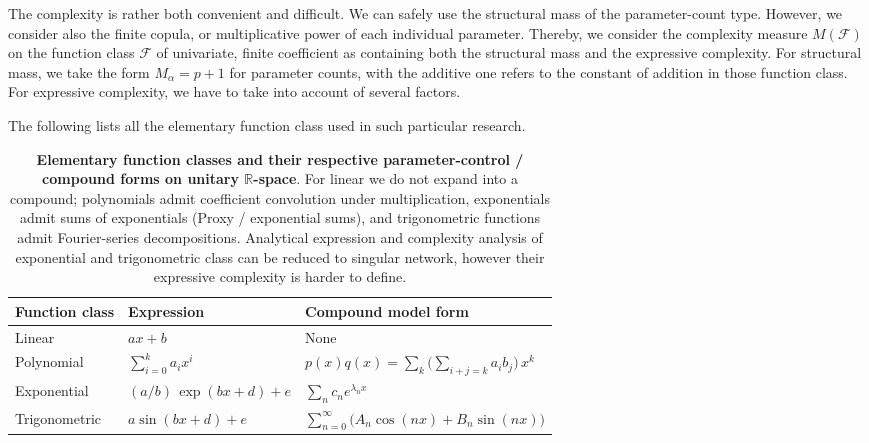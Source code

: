 \documentclass[twoside,10pt]{article}
\begin{document}
The complexity is rather both convenient and difficult. We can safely use the structural mass of the parameter-count type. However, we consider also the finite copula, or multiplicative power of each individual parameter. Thereby, we consider the complexity measure $M(\mathcal{F})$ on the function class $\mathcal{F}$ of univariate, finite coefficient as containing both the structural mass and the expressive complexity. For structural mass, we take the form $M_{\alpha}= p+1$ for parameter counts, with the additive one refers to the constant of addition in those function class. For expressive complexity, we have to take into account of several factors. 

The following lists all the elementary function class used in such particular research. 

\begin{table}[htb]
  \centering
  \begin{tabularx}{\textwidth}{L{2cm} L{3cm} Y}
    \toprule
    Function class & Expression & Compound model form\\
    \midrule
    Linear & \(a x + b\) & None \\
    Polynomial & \(\displaystyle \sum_{i=0}^{k} a_{i} x^{i}\) &
        $p(x)q(x)=\sum_{k}\Big(\sum_{i+j=k} a_i b_j\Big)\,x^k$\\
    Exponential & \((a/b)\,\exp(bx+d)+e\) &
    \(\displaystyle \sum_{n} c_n e^{\lambda_n x}\)
    \\
    Trigonometric & \(a\sin(bx+d)+e\) &
    \(\displaystyle \sum_{n=0}^{\infty}\big(A_n\cos(nx)+B_n\sin(nx)\big)\)
    \\
    \bottomrule
  \end{tabularx}
  \caption{\textbf{Elementary function classes and their respective parameter-control / compound forms on unitary $\mathbb{R}$-space}. For linear we do not expand into a compound; polynomials admit coefficient convolution under multiplication,
    exponentials admit sums of exponentials (Proxy / exponential sums), and trigonometric functions admit Fourier-series decompositions. Analytical expression and complexity analysis of exponential and trigonometric class can be reduced to singular network, however their expressive complexity is harder to define. 
  }
\end{table}
\end{document}
